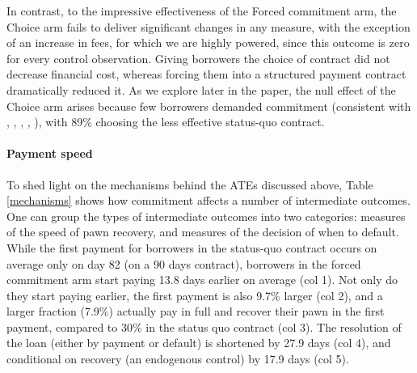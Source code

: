 \documentclass[12pt, a4paper]{article}
\begin{document}
In contrast, to the impressive effectiveness of the Forced commitment arm, the Choice arm fails to deliver significant changes in any measure, with the exception of an increase in fees, for which we are highly powered, since this outcome is zero for every control observation. Giving borrowers the choice of contract did not decrease financial cost, whereas forcing them into a structured payment contract dramatically reduced it. As we explore later in the paper, the null effect of the Choice arm arises because few borrowers demanded commitment (consistent with \cite{Ashraf}, \cite{Gine}, \cite{Ted}, \cite{Royer}, \cite{Sprenger}), with 89\% choosing the less effective status-quo contract.

\paragraph*{Payment speed} To shed light on the mechanisms behind the ATEs discussed above, Table \ref{mechanisms} shows how commitment affects a number of intermediate outcomes. One can group the types of intermediate outcomes into two categories: measures of the speed of pawn recovery, and measures of the decision of when to default. While the first payment for borrowers in the status-quo contract occurs on average only on day 82 (on a 90 days contract), borrowers in the forced commitment arm start paying 13.8 days earlier on average (col 1). Not only do they start paying earlier, the first payment is also 9.7\% larger (col 2), and a larger fraction (7.9\%)  actually pay in full and recover their pawn in the first payment, compared to 30\% in the status quo contract (col 3). The resolution of the loan (either by payment or default) is shortened by 27.9 days (col 4), and conditional on recovery (an endogenous control) by 17.9 days (col 5).
\end{document}

